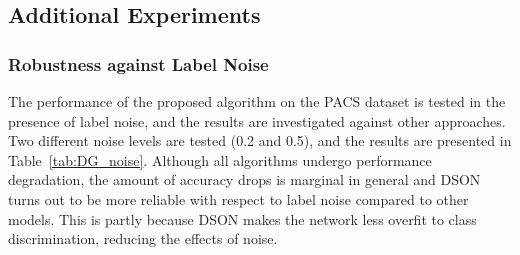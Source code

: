 \documentclass[runningheads]{llncs}
\begin{document}
\subsection{Additional Experiments}

\subsubsection{Robustness against Label Noise}
The performance of the proposed algorithm on the PACS dataset is tested in the presence of label noise, and the results are investigated against other approaches.
Two different noise levels are tested (0.2 and 0.5), and the results are presented in Table~\ref{tab:DG_noise}.
Although all algorithms undergo performance degradation, the amount of accuracy drops is marginal in general and DSON turns out to be more reliable with respect to label noise compared to other models.
This is partly because DSON makes the network less overfit to class discrimination, reducing the effects of noise.



\begin{table}[t]
	\begin{center}
	\caption{Multi-source domain adaptation results on the PACS dataset using \cite{shu2019transferable} as a backbone with a ResNet-18 architecture.}
	\label{tab:multi-source_DA}
	\end{center}

\end{table}
\end{document}
